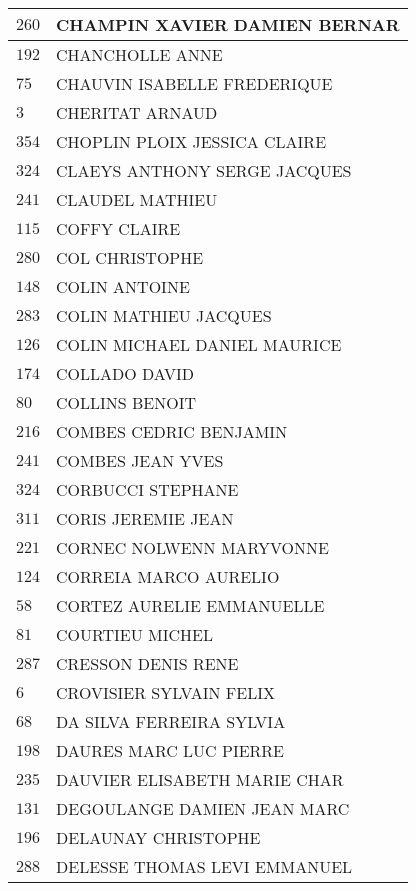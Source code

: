 \begin{xltabular}{\linewidth}{|l|X|}
    \hline
    $260$ & CHAMPIN XAVIER DAMIEN BERNAR \\
    \hline
    $192$ & CHANCHOLLE ANNE \\
    \hline
    $75$ & CHAUVIN ISABELLE FREDERIQUE \\
    \hline
    $3$ & CHERITAT ARNAUD \\
    \hline
    $354$ & CHOPLIN PLOIX JESSICA CLAIRE \\
    \hline
    $324$ & CLAEYS ANTHONY SERGE JACQUES \\
    \hline
    $241$ & CLAUDEL MATHIEU \\
    \hline
    $115$ & COFFY CLAIRE \\
    \hline
    $280$ & COL CHRISTOPHE \\
    \hline
    $148$ & COLIN ANTOINE \\
    \hline
    $283$ & COLIN MATHIEU JACQUES \\
    \hline
    $126$ & COLIN MICHAEL DANIEL MAURICE \\
    \hline
    $174$ & COLLADO DAVID \\
    \hline
    $80$ & COLLINS BENOIT \\
    \hline
    $216$ & COMBES CEDRIC BENJAMIN \\
    \hline
    $241$ & COMBES JEAN YVES \\
    \hline
    $324$ & CORBUCCI STEPHANE \\
    \hline
    $311$ & CORIS JEREMIE JEAN \\
    \hline
    $221$ & CORNEC NOLWENN MARYVONNE \\
    \hline
    $124$ & CORREIA MARCO AURELIO \\
    \hline
    $58$ & CORTEZ AURELIE EMMANUELLE \\
    \hline
    $81$ & COURTIEU MICHEL \\
    \hline
    $287$ & CRESSON DENIS RENE \\
    \hline
    $6$ & CROVISIER SYLVAIN FELIX \\
    \hline
    $68$ & DA SILVA FERREIRA SYLVIA \\
    \hline
    $198$ & DAURES MARC LUC PIERRE \\
    \hline
    $235$ & DAUVIER ELISABETH MARIE CHAR \\
    \hline
    $131$ & DEGOULANGE DAMIEN JEAN MARC \\
    \hline
    $196$ & DELAUNAY CHRISTOPHE \\
    \hline
    $288$ & DELESSE THOMAS LEVI EMMANUEL \\

\end{xltabular}
